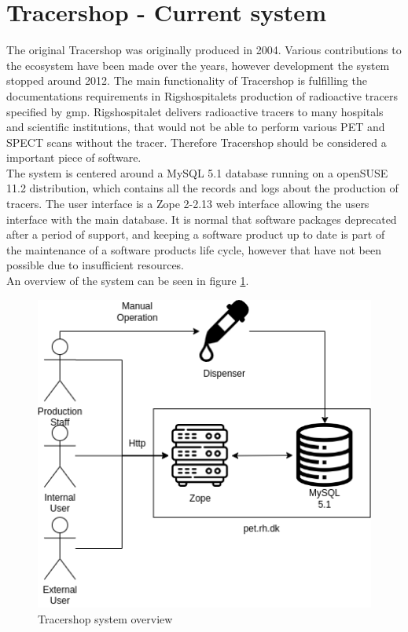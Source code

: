 \documentclass{article}
\begin{document}
\section*{Tracershop - Current system}
The original Tracershop was originally produced in 2004. Various contributions to the ecosystem have been made over the years,
however development the system stopped around 2012.
The main functionality of Tracershop is fulfilling the documentations requirements in Rigshospitalets production of radioactive tracers specified by \gls{gmp}.
Rigshospitalet delivers radioactive tracers to many hospitals and scientific institutions, that would not be able to perform various PET and SPECT scans without the tracer.
Therefore Tracershop should be considered a important piece of software.\\
The system is centered around a MySQL 5.1 database running on a openSUSE 11.2 distribution, which contains all the records and logs about the production of tracers.
The user interface is a Zope 2-2.13 web interface allowing the users interface with the main database.
It is normal that software packages deprecated after a period of support, and keeping a software product up to date is part of the maintenance of a software products life cycle,
however that have not been possible due to insufficient resources.\\
An overview of the system can be seen in figure \ref{fig:oldsys}.
\begin{figure}[ht]
  \begin{center}
    \includegraphics[width=0.6\linewidth]{OldSetup.png}
    \caption{Tracershop system overview}
    \label{fig:oldsys}
  \end{center}
\end{figure}
\end{document}
